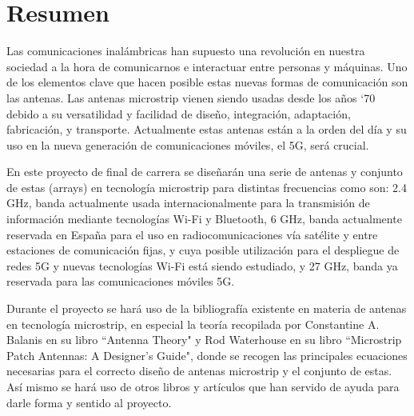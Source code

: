 \thispagestyle{empty}
\vspace*{-20cm}
\chapter*{Resumen}

\par Las comunicaciones inalámbricas han supuesto una revolución en nuestra sociedad a la hora de comunicarnos e interactuar entre personas y máquinas. Uno de los elementos clave que hacen posible estas nuevas formas de comunicación son las antenas. Las antenas microstrip vienen siendo usadas desde los años ‘70 debido a su versatilidad y facilidad de diseño, integración, adaptación, fabricación, y transporte. Actualmente estas antenas están a la orden del día y su uso en la nueva generación de comunicaciones móviles, el 5G, será crucial.
\\
\par En este proyecto de final de carrera se diseñarán una serie de antenas y conjunto de estas (arrays) en tecnología microstrip para distintas frecuencias como son: 2.4 GHz, banda actualmente usada internacionalmente para la transmisión de información mediante tecnologías Wi-Fi y Bluetooth, 6 GHz, banda actualmente reservada en España para el uso en radiocomunicaciones vía satélite y entre estaciones de comunicación fijas, y cuya posible utilización para el despliegue de redes 5G y nuevas tecnologías Wi-Fi está siendo estudiado, y 27 GHz, banda ya reservada para las comunicaciones móviles 5G.
\\
\par Durante el proyecto se hará uso de la bibliografía existente en materia de antenas en tecnología microstrip, en especial la teoría recopilada por Constantine A. Balanis en su libro ``Antenna Theory" y Rod Waterhouse en su libro ``Microstrip Patch Antennas: A Designer's Guide", donde se recogen las principales ecuaciones necesarias para el correcto diseño de antenas microstrip y el conjunto de estas. Así mismo se hará uso de otros libros y artículos que han servido de ayuda para darle forma y sentido al proyecto.
\\
